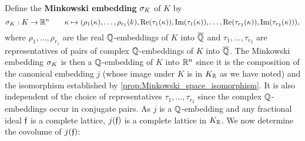     Define the \textbf{Minkowski embedding} $\sigma_{K}$ of $K$ by
    \[
      \sigma_{K}:K \to \mathbb{R}^{n} \qquad \kappa \mapsto (\rho_{1}(\kappa),\ldots,\rho_{r_{1}}(k),\mathrm{Re}(\tau_{1}(\kappa)),\mathrm{Im}(\tau_{1}(\kappa)),\ldots,\mathrm{Re}(\tau_{r_{2}}(\kappa)),\mathrm{Im}(\tau_{r_{2}}(\kappa))),
    \]
    where $\rho_{1},\ldots,\rho_{r_{1}}$ are the real $\mathbb{Q}$-embeddings of $K$ into $\overline{\mathbb{Q}}$ and $\tau_{1},\ldots,\tau_{r_{2}}$ are representatives of pairs of complex $\mathbb{Q}$-embeddings of $K$ into $\overline{\mathbb{Q}}$. The Minkowski embedding $\sigma_{K}$ is then a $\mathbb{Q}$-embedding of $K$ into $\mathbb{R}^{n}$ since it is the composition of the canonical embedding $j$ (whose image under $K$ is in $K_{\mathbb{R}}$ as we have noted) and the isomorphism established by \cref{prop:Minkowski_space_isomorphism}. It is also independent of the choice of representatives $\tau_{1},\ldots,\tau_{r_{2}}$ since the complex $\mathbb{Q}$-embeddings occur in conjugate pairs. As $j$ is a $\mathbb{Q}$-embedding and any fractional ideal $\mathfrak{f}$ is a complete lattice, $j(\mathfrak{f})$ is a complete lattice in $K_{\mathbb{R}}$. We now determine the covolume of $j(\mathfrak{f})$:

